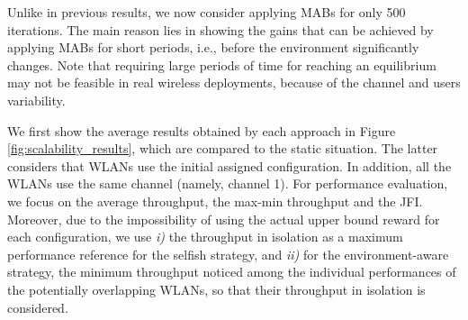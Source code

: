 \documentclass[preprint,12pt]{elsarticle}
\begin{document}
Unlike in previous results, we now consider applying MABs for only 500 iterations. The main reason lies in showing the gains that can be achieved by applying MABs for short periods, i.e., before the environment significantly changes. Note that requiring large periods of time for reaching an equilibrium may not be feasible in real wireless deployments, because of the channel and users variability.

We first show the average results obtained by each approach in Figure \ref{fig:scalability_results}, which are compared to the static situation. The latter considers that WLANs use the initial assigned configuration. In addition, all the WLANs use the same channel (namely, channel 1). For performance evaluation, we focus on the average throughput, the max-min throughput and the JFI. Moreover, due to the impossibility of using the actual upper bound reward for each configuration, we use \emph{i)} the throughput in isolation as a maximum performance reference for the selfish strategy, and \emph{ii)} for the environment-aware strategy, the minimum throughput noticed among the individual performances of the potentially overlapping WLANs, so that their throughput in isolation is considered.
\end{document}
